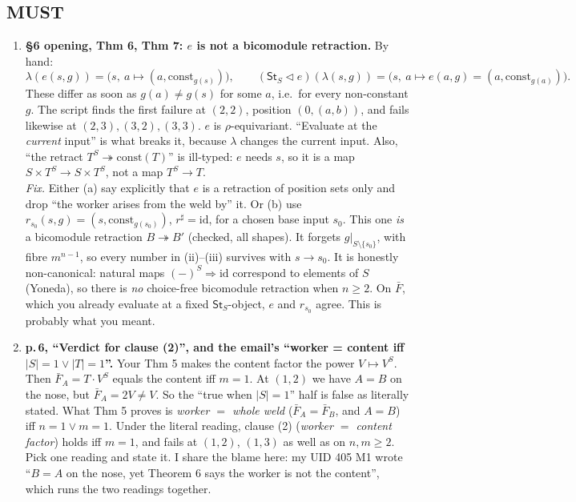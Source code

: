 \documentclass[10pt]{article}
\newcommand{\tri}{\mathbin{\triangleleft}}
\newcommand{\St}{\mathsf{St}}
\newcommand{\cst}{\mathrm{const}}
\begin{document}
\subsection*{MUST}
\begin{enumerate}[label=\textbf{M\arabic*.},leftmargin=*]
\item \textbf{\S6 opening, Thm 6, Thm 7: $e$ is not a bicomodule retraction.} By hand:
  \[
    \lambda(e(s,g))=\bigl(s,\ a\mapsto(a,\cst_{g(s)})\bigr),\qquad
    (\St_S\tri e)(\lambda(s,g))=\bigl(s,\ a\mapsto e(a,g)=(a,\cst_{g(a)})\bigr).
  \]
  These differ as soon as $g(a)\neq g(s)$ for some $a$, i.e.\ for every non-constant $g$. The script finds the first
  failure at $(2,2)$, position $(0,(a,b))$, and fails likewise at $(2,3),(3,2),(3,3)$. $e$ is $\rho$-equivariant. ``Evaluate at
  the \emph{current} input'' is what breaks it, because $\lambda$ changes the current input. Also,
  ``the retract $T^S\twoheadrightarrow\cst(T)$'' is ill-typed: $e$ needs $s$, so it is a map
  $S\times T^S\to S\times T^S$, not a map $T^S\to T$.\\
  \emph{Fix.} Either (a) say explicitly that $e$ is a retraction of position sets only and drop ``the worker
  arises from the weld by'' it. Or (b) use $r_{s_0}(s,g)=(s,\cst_{g(s_0)})$, $r^\sharp=\mathrm{id}$, for a
  chosen base input $s_0$. This one \emph{is} a bicomodule retraction $B\twoheadrightarrow B'$ (checked, all shapes). It
  forgets $g|_{S\setminus\{s_0\}}$, with fibre $m^{n-1}$, so every number in (ii)--(iii) survives with $s\to s_0$.
  It is honestly non-canonical: natural maps $(-)^S\Rightarrow\mathrm{id}$ correspond to elements of $S$
  (Yoneda), so there is \emph{no} choice-free bicomodule retraction when $n\ge2$. On $\bar F$, which you
  already evaluate at a fixed $\St_S$-object, $e$ and $r_{s_0}$ agree. This is probably what you meant.
\item \textbf{p.\,6, ``Verdict for clause (2)'', and the email's ``worker = content iff $|S|=1\vee|T|=1$''.}
  Your Thm 5 makes the content factor the power $V\mapsto V^S$. Then $\bar F_A=T\cdot V^S$ equals the content iff
  $m=1$. At $(1,2)$ we have $A=B$ on the nose, but $\bar F_A=2V\neq V$. So the ``true when $|S|=1$'' half
  is false as literally stated. What Thm 5 proves is \emph{worker $=$ whole weld} ($\bar F_A=\bar F_B$, and $A=B$)
  iff $n=1\vee m=1$. Under the literal reading, clause (2) (\emph{worker $=$ content factor}) holds iff $m=1$,
  and fails at $(1,2)$, $(1,3)$ as well as on $n,m\ge2$. Pick one reading and state it. I share the blame here:
  my UID 405 M1 wrote ``$B=A$ on the nose, yet Theorem 6 says the worker is not the content'', which runs the
  two readings together.
\end{enumerate}
\end{document}
